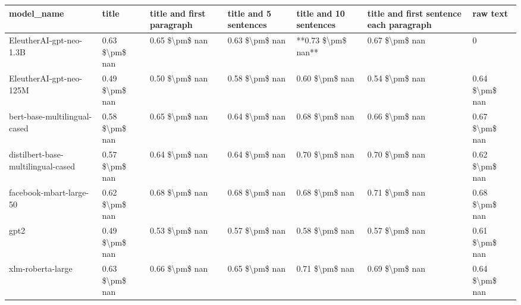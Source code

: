\begin{tabular}{lllllll}
\toprule
                        model\_name &          title & title and first paragraph & title and 5 sentences & title and 10 sentences & title and first sentence each paragraph &       raw text \\
\midrule
           EleutherAI-gpt-neo-1.3B & 0.63 \$\textbackslash pm\$ nan &            0.65 \$\textbackslash pm\$ nan &        0.63 \$\textbackslash pm\$ nan &     **0.73 \$\textbackslash pm\$ nan** &                          0.67 \$\textbackslash pm\$ nan &              0 \\
           EleutherAI-gpt-neo-125M & 0.49 \$\textbackslash pm\$ nan &            0.50 \$\textbackslash pm\$ nan &        0.58 \$\textbackslash pm\$ nan &         0.60 \$\textbackslash pm\$ nan &                          0.54 \$\textbackslash pm\$ nan & 0.64 \$\textbackslash pm\$ nan \\
      bert-base-multilingual-cased & 0.58 \$\textbackslash pm\$ nan &            0.65 \$\textbackslash pm\$ nan &        0.64 \$\textbackslash pm\$ nan &         0.68 \$\textbackslash pm\$ nan &                          0.66 \$\textbackslash pm\$ nan & 0.67 \$\textbackslash pm\$ nan \\
distilbert-base-multilingual-cased & 0.57 \$\textbackslash pm\$ nan &            0.64 \$\textbackslash pm\$ nan &        0.64 \$\textbackslash pm\$ nan &         0.70 \$\textbackslash pm\$ nan &                          0.70 \$\textbackslash pm\$ nan & 0.62 \$\textbackslash pm\$ nan \\
           facebook-mbart-large-50 & 0.62 \$\textbackslash pm\$ nan &            0.68 \$\textbackslash pm\$ nan &        0.68 \$\textbackslash pm\$ nan &         0.68 \$\textbackslash pm\$ nan &                          0.71 \$\textbackslash pm\$ nan & 0.68 \$\textbackslash pm\$ nan \\
                              gpt2 & 0.49 \$\textbackslash pm\$ nan &            0.53 \$\textbackslash pm\$ nan &        0.57 \$\textbackslash pm\$ nan &         0.58 \$\textbackslash pm\$ nan &                          0.57 \$\textbackslash pm\$ nan & 0.61 \$\textbackslash pm\$ nan \\
                 xlm-roberta-large & 0.63 \$\textbackslash pm\$ nan &            0.66 \$\textbackslash pm\$ nan &        0.65 \$\textbackslash pm\$ nan &         0.71 \$\textbackslash pm\$ nan &                          0.69 \$\textbackslash pm\$ nan & 0.64 \$\textbackslash pm\$ nan \\
\bottomrule
\end{tabular}

